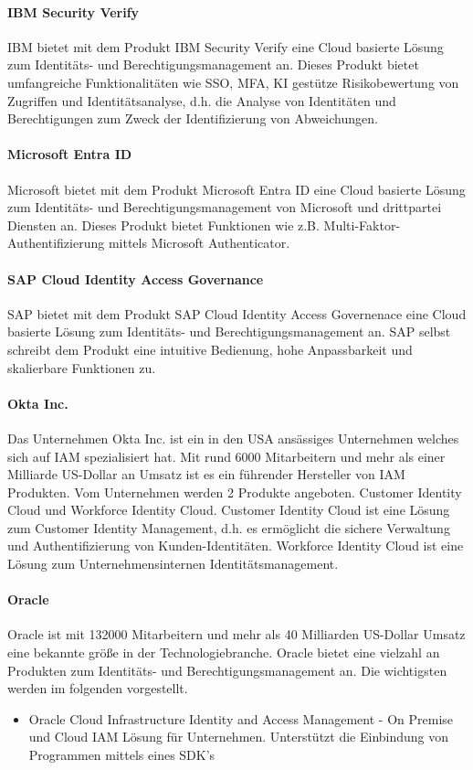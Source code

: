 \documentclass[10pt]{article}
\begin{document}
\paragraph{IBM Security Verify}
IBM bietet mit dem Produkt \glqq{}IBM Security Verify\grqq{} eine Cloud basierte Lösung zum Identitäts- und Berechtigungsmanagement an. Dieses Produkt bietet umfangreiche Funktionalitäten wie SSO, MFA, KI gestütze Risikobewertung von Zugriffen und Identitätsanalyse, d.h. die Analyse von Identitäten und Berechtigungen zum Zweck der Identifizierung von Abweichungen.
\paragraph{Microsoft Entra ID}
Microsoft bietet mit dem Produkt \glqq{}Microsoft Entra ID\grqq{} eine Cloud basierte Lösung zum Identitäts- und Berechtigungsmanagement von Microsoft und drittpartei Diensten an. Dieses Produkt bietet Funktionen wie z.B. Multi-Faktor-Authentifizierung mittels Microsoft Authenticator.
\paragraph{SAP Cloud Identity Access Governance}
SAP bietet mit dem Produkt \glqq{}SAP Cloud Identity Access Governenace\grqq{} eine Cloud basierte Lösung zum Identitäts- und Berechtigungsmanagement an. SAP selbst schreibt dem Produkt eine intuitive Bedienung, hohe Anpassbarkeit und skalierbare Funktionen zu.
\paragraph{Okta Inc.}
Das Unternehmen Okta Inc. ist ein in den USA ansässiges Unternehmen welches sich auf IAM spezialisiert hat. Mit rund 6000 Mitarbeitern und mehr als einer Milliarde US-Dollar an Umsatz ist es ein führender Hersteller von IAM Produkten. Vom Unternehmen werden 2 Produkte angeboten. Customer Identity Cloud und Workforce Identity Cloud. Customer Identity Cloud ist eine Lösung zum Customer Identity Management, d.h. es ermöglicht die sichere Verwaltung und Authentifizierung von Kunden-Identitäten. Workforce Identity Cloud ist eine Lösung zum Unternehmensinternen Identitätsmanagement.
\paragraph{Oracle}
Oracle ist mit 132000 Mitarbeitern und mehr als 40 Milliarden US-Dollar Umsatz eine bekannte größe in der Technologiebranche. Oracle bietet eine vielzahl an Produkten zum Identitäts- und Berechtigungsmanagement an. Die wichtigsten werden im folgenden vorgestellt.
\begin{itemize}
  \item Oracle Cloud Infrastructure Identity and Access Management - On Premise und Cloud IAM Lösung für Unternehmen. Unterstützt die Einbindung von Programmen mittels eines SDK's
\end{itemize}
\end{document}

